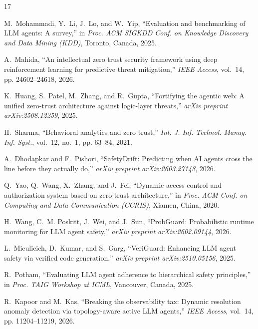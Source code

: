 \documentclass[conference]{IEEEtran}
\begin{document}

\begin{thebibliography}{17}

M.~Mohammadi, Y.~Li, J.~Lo, and W.~Yip, ``Evaluation and benchmarking of LLM agents: A survey,'' in \emph{Proc. ACM SIGKDD Conf. on Knowledge Discovery and Data Mining (KDD)}, Toronto, Canada, 2025.

A.~Mahida, ``An intellectual zero trust security framework using deep reinforcement learning for predictive threat mitigation,'' \emph{IEEE Access}, vol.~14, pp. 24602--24618, 2026.

K.~Huang, S.~Patel, M.~Zhang, and R.~Gupta, ``Fortifying the agentic web: A unified zero-trust architecture against logic-layer threats,'' \emph{arXiv preprint arXiv:2508.12259}, 2025.

H.~Sharma, ``Behavioral analytics and zero trust,'' \emph{Int. J. Inf. Technol. Manag. Inf. Syst.}, vol.~12, no.~1, pp. 63--84, 2021.

A.~Dhodapkar and F.~Pishori, ``SafetyDrift: Predicting when AI agents cross the line before they actually do,'' \emph{arXiv preprint arXiv:2603.27148}, 2026.

Q.~Yao, Q.~Wang, X.~Zhang, and J.~Fei, ``Dynamic access control and authorization system based on zero-trust architecture,'' in \emph{Proc. ACM Conf. on Computing and Data Communication (CCRIS)}, Xiamen, China, 2020.

H.~Wang, C.~M. Poskitt, J.~Wei, and J.~Sun, ``ProbGuard: Probabilistic runtime monitoring for LLM agent safety,'' \emph{arXiv preprint arXiv:2602.09144}, 2026.

L.~Miculicich, D.~Kumar, and S.~Garg, ``VeriGuard: Enhancing LLM agent safety via verified code generation,'' \emph{arXiv preprint arXiv:2510.05156}, 2025.

R.~Potham, ``Evaluating LLM agent adherence to hierarchical safety principles,'' in \emph{Proc. TAIG Workshop at ICML}, Vancouver, Canada, 2025.

R.~Kapoor and M.~Kas, ``Breaking the observability tax: Dynamic resolution anomaly detection via topology-aware active LLM agents,'' \emph{IEEE Access}, vol.~14, pp. 11204--11219, 2026.


\end{thebibliography}
\end{document}
